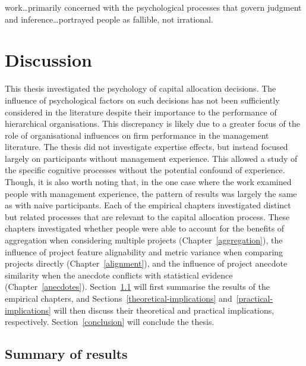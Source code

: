 \documentclass[a4paper, nobind, dvipsnames]{templates/ociamthesis}
\theoremstyle{definition}
\theoremstyle{definition}
\theoremstyle{definition}
\theoremstyle{definition}
\theoremstyle{remark}
\begin{document}
\begin{savequote}
work\ldots primarily concerned with the psychological processes that
govern judgment and inference\ldots portrayed people as fallible, not
irrational.
\end{savequote}

\hypertarget{discussion}{%
\chapter{Discussion}\label{discussion}}

\minitoc

This thesis investigated the psychology of capital allocation decisions. The
influence of psychological factors on such decisions has not been sufficiently
considered in the literature despite their importance to the performance of
hierarchical organisations. This discrepancy is likely due to a greater focus of
the role of organisational influences on firm performance in the management
literature. The thesis did not investigate expertise effects, but instead
focused largely on participants without management experience. This allowed a
study of the specific cognitive processes without the potential confound of
experience. Though, it is also worth noting that, in the one case where the work
examined people with management experience, the pattern of results was largely
the same as with naive participants. Each of the empirical chapters investigated
distinct but related processes that are relevant to the capital allocation
process. These chapters investigated whether people were able to account for the
benefits of aggregation when considering multiple projects
(Chapter~\ref{aggregation}), the influence of project feature alignability and
metric variance when comparing projects directly (Chapter~\ref{alignment}), and
the influence of project anecdote similarity when the anecdote conflicts with
statistical evidence (Chapter~\ref{anecdotes}).
Section~\ref{summary-of-results} will first summarise the results of the
empirical chapters, and Sections~\ref{theoretical-implications}
and~\ref{practical-implications} will then discuss their theoretical and
practical implications, respectively. Section~\ref{conclusion} will conclude
the thesis.

\hypertarget{summary-of-results}{%
\section{Summary of results}\label{summary-of-results}}
\end{document}
